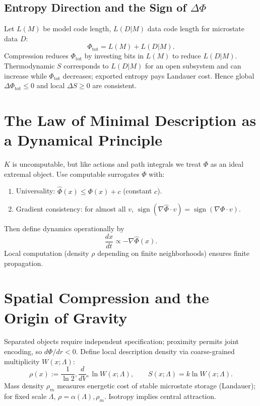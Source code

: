 \documentclass[aps,preprint,onecolumn,longbibliography,nofootinbib]{revtex4-2}
\numberwithin{equation}{section}
\begin{document}
\subsection{Entropy Direction and the Sign of $\Delta\Phi$}\label{sec:sign}
Let $L(M)$ be model code length, $L(D|M)$ data code length for microstate data $D$:
\begin{equation}
\Phi_{\text{tot}}=L(M)+L(D|M).\label{eq:mdl-split}
\end{equation}
Compression reduces $\Phi_{\text{tot}}$ by investing bits in $L(M)$ to reduce $L(D|M)$. Thermodynamic $S$ corresponds to $L(D|M)$ for an open subsystem and can increase while $\Phi_{\text{tot}}$ decreases; exported entropy pays Landauer cost. Hence global $\Delta\Phi_{\text{tot}}\le0$ and local $\Delta S\ge0$ are consistent.

\section{The Law of Minimal Description as a Dynamical Principle}\label{sec:dyn}
$K$ is uncomputable, but like actions and path integrals we treat $\Phi$ as an ideal extremal object. Use computable surrogates $\widehat\Phi$ with:
\begin{enumerate}
\item Universality: $\widehat\Phi(x)\le\Phi(x)+c$ (constant $c$).
\item Gradient consistency: for almost all $v$, $\operatorname{sign}(\nabla\widehat\Phi\cdot v)=\operatorname{sign}(\nabla\Phi\cdot v)$.
\end{enumerate}
Then define dynamics operationally by
\begin{equation}
\frac{dx}{dt}\propto-\nabla\widehat\Phi(x).\label{eq:dynamics}
\end{equation}
Local computation (density $\rho$ depending on finite neighborhoods) ensures finite propagation.

\section{Spatial Compression and the Origin of Gravity}
Separated objects require independent specification; proximity permits joint encoding, so $d\Phi/dr<0$. Define local description density via coarse-grained multiplicity $W(x;\Lambda)$:
\begin{equation}
\rho(x):=\frac{1}{\ln2},\frac{d}{dV},\ln W(x;\Lambda),\qquad S(x;\Lambda)=k\ln W(x;\Lambda).\label{eq:rhorig}
\end{equation}
Mass density $\rho_m$ measures energetic cost of stable microstate storage (Landauer); for fixed scale $\Lambda$, $\rho=\alpha(\Lambda),\rho_m$. Isotropy implies central attraction.
\end{document}
